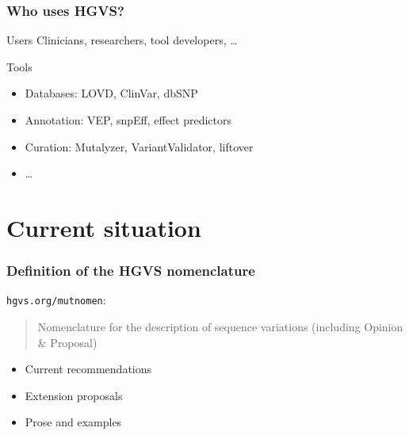\documentclass[14pt]{beamer}
\begin{document}
\begin{frame}
  \frametitle{Who uses \textcolor{hgvs}{HGVS}?}

  \begin{block}{Users}
    Clinicians, researchers, tool developers, \ldots
  \end{block}

  \begin{block}{Tools}
    \begin{itemize}
      \item Databases: LOVD, ClinVar, dbSNP
      \item Annotation: VEP, snpEff, effect predictors
      \item Curation: Mutalyzer, VariantValidator, liftover
      \item \ldots
    \end{itemize}
  \end{block}
\end{frame}


\section{Current situation}




\begin{frame}[fragile]
  \frametitle{Definition of the \textcolor{hgvs}{HGVS} nomenclature}

  \verb|hgvs.org/mutnomen|:\\[1em]

  \begin{quote}
    Nomenclature for the description of sequence variations (including Opinion
    \& Proposal)
  \end{quote}

  \begin{itemize}
    \item Current recommendations
    \item Extension proposals
    \item Prose and examples
  \end{itemize}
\end{frame}
\end{document}
